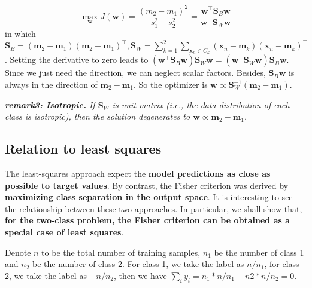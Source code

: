 \documentclass{article}
\begin{document}
	
	\begin{equation}
	\max_\mathbf{w} J(\mathbf{w}) = \frac{(m_2-m_1)^2}{s_1^2+s_2^2} 
	= \frac{\mathbf{w}^\top \mathbf{S}_B \mathbf{w}}{\mathbf{w}^\top \mathbf{S}_W \mathbf{w}}
	\end{equation}
in which $\mathbf{S}_B=(\mathbf{m}_2-\mathbf{m}_1)(\mathbf{m}_2-\mathbf{m}_1)^\top, \mathbf{S}_W=\sum_{k=1}^2\sum_{\mathbf{x}_n\in C_k}(\mathbf{x}_n-\mathbf{m}_k)(\mathbf{x}_n-\mathbf{m}_k)^\top$. Setting the derivative to zero leads to $(\mathbf{w}^\top \mathbf{S}_B \mathbf{w}) \mathbf{S}_W \mathbf{w} = (\mathbf{w}^\top \mathbf{S}_W \mathbf{w}) \mathbf{S}_B \mathbf{w}$. Since we just need the direction, we can neglect scalar factors. Besides,  $\mathbf{S}_B \mathbf{w}$ is always in the direction of $\mathbf{m}_2 - \mathbf{m}_1$. So the optimizer is $\mathbf{w}\propto \mathbf{S}_W^{-1} (\mathbf{m}_2-\mathbf{m}_1)$.
	
	\begin{framed}
	\begin{scriptsize}
	\begin{spacing}{1.2}
	\noindent\textit{\textbf{remark3: Isotropic.} If $\mathbf{S}_W$ is unit matrix (i.e., the data distribution of each class is isotropic), then the solution degenerates to $	\mathbf{w}\propto \mathbf{m}_2-\mathbf{m}_1$.} 

	\end{spacing}
	\end{scriptsize}
	\end{framed}
	
\subsection{Relation to least squares}

	The least-squares approach expect the \textbf{model predictions as close as possible to target values}. By contrast, the Fisher criterion was derived by \textbf{maximizing class separation in the output space}. It is interesting to see the relationship between these two approaches. In particular, we shall show that, \textbf{for the two-class problem, the Fisher criterion can be obtained as a special case of least squares}.

	Denote $n$ to be the total number of training samples, $n_1$ be the number of class 1 and $n_2$ be the number of class 2. For class 1, we take the label as $n/n_1$, for class 2, we take the label as $-n/n_2$, then we have $\sum_i y_i = n_1 * n / n_1 - n2 * n / n_2 = 0$.
	
\end{document}
